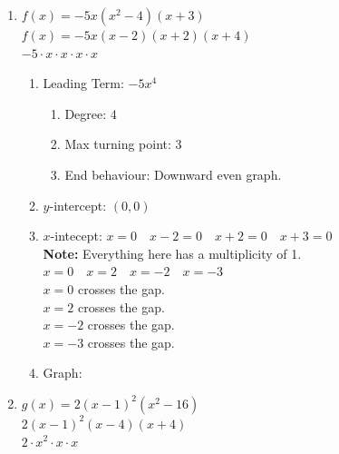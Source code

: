 \begin{example}
\begin{enumerate}
\begin{enumerate}
    \end{enumerate}
  \item $f(x) = -5x(x^2 - 4)(x + 3)$ \\
    $f(x) = -5x(x - 2)(x + 2)(x + 4)$ \\
    $-5 \cdot x \cdot x \cdot x \cdot x$ \\
    \begin{enumerate}
    \item Leading Term: $-5x^4$
      \begin{enumerate}
      \item Degree: $4$
      \item Max turning point: $3$
      \item End behaviour: Downward even graph.
      \end{enumerate}
    \item $y$-intercept: $(0, 0)$
    \item $x$-intecept: $x = 0 \quad x - 2 = 0 \quad x + 2 = 0 \quad x + 3 = 0$ \\
      \textbf{Note: }Everything here has a multiplicity of 1. \\
      $x = 0 \quad x = 2 \quad x = -2 \quad x = -3$ \\
      $x = 0$ crosses the gap. \\
      $x = 2$ crosses the gap. \\
      $x = -2$ crosses the gap. \\
      $x = -3$ crosses the gap.
    \item Graph:
      \begin{center}
      \end{center}
    \end{enumerate}
  \item $g(x) = 2(x - 1)^2(x^2 - 16)$ \\
    $2(x - 1)^2(x - 4)(x + 4)$ \\
    $2 \cdot x^2 \cdot x \cdot x$
    \begin{enumerate}

\end{enumerate}
\end{enumerate}
\end{example}
